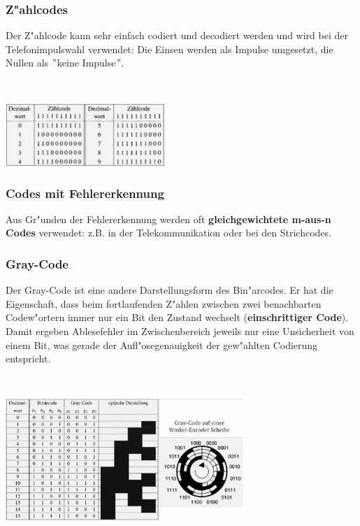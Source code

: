 \subsubsection{Z"ahlcodes}
\begin{minipage}{9cm}
	\vspace{-6ex}
	Der Z"ahlcode kann sehr einfach codiert und decodiert werden und wird bei der Telefonimpulswahl verwendet: Die Einsen werden als Impulse umgesetzt, die Nullen als $"$keine Impulse$"$.
\end{minipage}
%
\begin{minipage}{0.5cm}
	\ \
\end{minipage}
%
\begin{minipage}{9cm}
	\includegraphics[width=6cm]{pics/2-Zaehlcodes}
\end{minipage}

\subsubsection{Codes mit Fehlererkennung}
Aus Gr"unden der Fehlererkennung werden oft \textbf{gleichgewichtete m-aus-n Codes} verwendet: z.B. in der Telekommunikation oder bei den Strichcodes.

\subsubsection{Gray-Code}
\begin{minipage}{9cm}
\vspace{-12ex}
	Der Gray-Code ist eine andere Darstellungsform des Bin"arcodes. Er hat die Eigenschaft, dass beim fortlaufenden Z"ahlen zwischen zwei benachbarten Codew"ortern immer nur ein Bit den Zustand wechselt (\textbf{einschrittiger Code}). Damit ergeben Ablesefehler im Zwischenbereich jeweils nur eine Unsicherheit von einem Bit, was gerade der Aufl"osegenauigkeit der gew"ahlten Codierung entspricht.
\end{minipage}
%
\begin{minipage}{0.5cm}
	\ \
\end{minipage}
%
\begin{minipage}{9cm}
	\includegraphics[width=9cm]{pics/2-Gray-Code}
\end{minipage}

